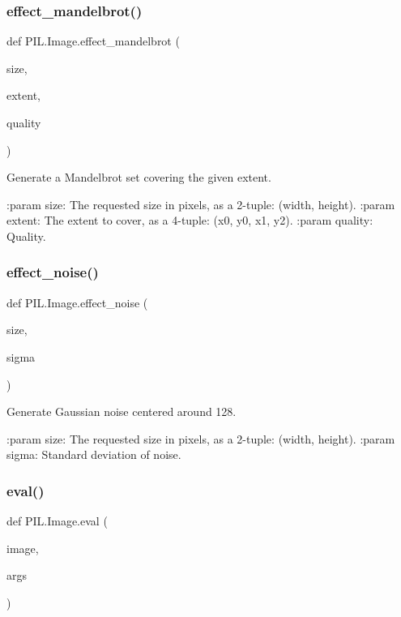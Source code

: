 \subsubsection{\texorpdfstring{effect\+\_\+mandelbrot()}{effect\_mandelbrot()}}
{\footnotesize\ttfamily def P\+I\+L.\+Image.\+effect\+\_\+mandelbrot (\begin{DoxyParamCaption}\item[{}]{size,  }\item[{}]{extent,  }\item[{}]{quality }\end{DoxyParamCaption})}

\begin{DoxyVerb}Generate a Mandelbrot set covering the given extent.

:param size: The requested size in pixels, as a 2-tuple:
   (width, height).
:param extent: The extent to cover, as a 4-tuple:
   (x0, y0, x1, y2).
:param quality: Quality.
\end{DoxyVerb}
 \mbox{\label{namespacePIL_1_1Image_a55100d92e0e9a190ab73f69249d74de1}} 
\subsubsection{\texorpdfstring{effect\+\_\+noise()}{effect\_noise()}}
{\footnotesize\ttfamily def P\+I\+L.\+Image.\+effect\+\_\+noise (\begin{DoxyParamCaption}\item[{}]{size,  }\item[{}]{sigma }\end{DoxyParamCaption})}

\begin{DoxyVerb}Generate Gaussian noise centered around 128.

:param size: The requested size in pixels, as a 2-tuple:
   (width, height).
:param sigma: Standard deviation of noise.
\end{DoxyVerb}
 \mbox{\label{namespacePIL_1_1Image_aec9f29cac3b547a7f4e4fd12c026668a}} 
\subsubsection{\texorpdfstring{eval()}{eval()}}
{\footnotesize\ttfamily def P\+I\+L.\+Image.\+eval (\begin{DoxyParamCaption}\item[{}]{image,  }\item[{}]{args }\end{DoxyParamCaption})}


